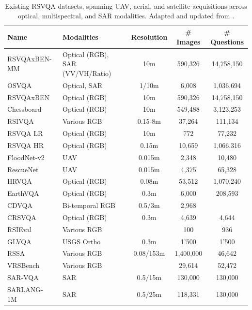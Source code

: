 \begin{table}[h]
\centering
\small
\begin{tabularx}{\textwidth}{l X c c c}
\hline
\textbf{Name} & \textbf{Modalities} & \textbf{Resolution} & \textbf{\# Images} & \textbf{\# Questions} \\
\hline
RSVQAxBEN-MM~\cite{tosato2024can} & Optical (RGB), SAR (VV/VH/Ratio) & 10m & 590,326 & 14,758,150 \\
OSVQA~\cite{zhao2024textguided} & Optical, SAR & 1/10m & 6,008 & 1,036,694 \\
RSVQAxBEN~\cite{lobry2021rsvqaben} & Optical (RGB) & 10m & 590,326 & 14,758,150 \\
Chessboard~\cite{tosato2025checkmate} & Optical (RGB) & 10m & 549,488 & 3,123,253 \\
RSIVQA~\cite{zheng2021rsivqa} & Various RGB & 0.15-8m & 37,264 & 111,134 \\
RSVQA LR~\cite{lobry2020rsvqa} & Optical (RGB) & 10m & 772 & 77,232 \\
RSVQA HR~\cite{lobry2020rsvqa} & Optical (RGB) & 0.15m & 10,659 & 1,066,316 \\
FloodNet-v2~\cite{sarkar2023floodnet} & UAV & 0.015m & 2,348 & 10,480 \\
RescueNet~\cite{sarkar2023rescuenet} & UAV & 0.015m & 4,375 & 65,328 \\
HRVQA~\cite{li2024hrvqa} & Optical (RGB) & 0.08m & 53,512 & 1,070,240 \\
EarthVQA~\cite{wang2024earthvqa} & Optical (RGB) & 0.3m & 6,000 & 208,593 \\
CDVQA~\cite{yuan2022cdvqa} & Bi-temporal RGB & 0.5/3m & 2,968 & \\
CRSVQA~\cite{zhang2023crsvqa} & Optical (RGB) & 0.3m & 4,639 & 4,644 \\
RSIEval~\cite{hu2023rsgpt} & Various RGB & & 100 & 936 \\
GLVQA~\cite{guo2022glvqa} & USGS Ortho & 0.3m & 1'500 & 1'500  \\
RSSA~\cite{pang2024h2rsvlm} & Various RGB & 0.08/153m & 1,400,000 & 46,642 \\
VRSBench~\cite{li2024vrsbench} & Various RGB & & 29,614 & 52,472 \\
SAR-VQA~\cite{cheng2025sartext} & SAR & 0.5/15m & 130,000 & 130,000 \\
SARLANG-1M~\cite{wei2025sarlang} & SAR & 0.5/25m & 118,331 & 130,000 \\
\hline
\end{tabularx}
\caption{Existing RSVQA datasets, spanning UAV, aerial, and satellite acquisitions across optical, multispectral, and SAR modalities. Adapted and updated from \cite{boussaidtosato2025tour}.}
\label{tab:rw-vqa-datasets}
\end{table}

